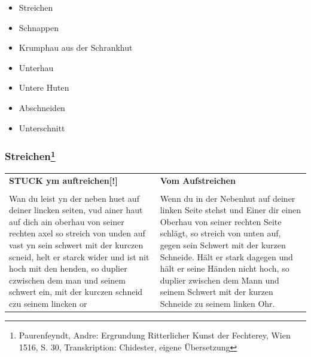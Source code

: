 \begin{itemize}
    \item Streichen
    \item Schnappen
    \item Krumphau aus der Schrankhut 
\end{itemize}

\hspace{0.5cm}

\begin{itemize}
    \item Unterhau
    \item Untere Huten
    \item Abschneiden
    \item Unterschnitt
\end{itemize}

\newpage
\null
\thispagestyle{empty}
\newpage

\subsubsection[Streichen]{Streichen\footnote{\hspace*{0.5ex}Paurenfeyndt, Andre: Ergrundung Ritterlicher Kunst der Fechterey, Wien 1516, S. 30, Transkription: Chidester, eigene Übersetzung}}

\begin{longtable}{p{6.25cm}p{6.25cm}}
\textbf{STUCK ym auftreichen[!]}
&
\textbf{Vom Aufstreichen}
\\
\\
Wan du leist yn der neben huet auf deiner lincken seiten, vud ainer haut auf dich ain oberhau von seiner rechten axel so streich von unden auf vast yn sein schwert mit der kurczen scneid, helt er starck wider und ist nit hoch mit den henden, so duplier czwischen dem man und seinem schwert ein, mit der kurczen schneid czu seinem lincken or
&
Wenn du in der Nebenhut auf deiner linken Seite stehst und Einer dir einen Oberhau von seiner rechten Seite schlägt, so streich von unten auf, gegen sein Schwert mit der kurzen Schneide. Hält er stark dagegen und hält er seine Händen nicht hoch, so duplier zwischen dem Mann und seinem Schwert mit der kurzen Schneide zu seinem linken Ohr.
\end{longtable}

\newpage

\begin{center}
\end{center}

